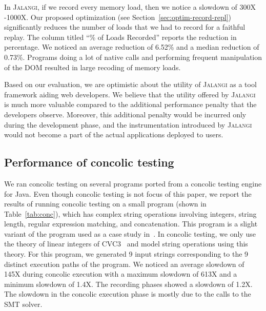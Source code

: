 \documentclass{sig-alternate}
\def\jalangi{\textsc{Jalangi}}
\begin{document}
In \jalangi{}, if we record every memory load, then we notice a
slowdown of 300X -1000X.  Our proposed optimization (see
Section~\ref{sec:optim-record-repl}) significantly reduces the number
of loads that we had to record for a faithful replay.  The column
titled ``\% of Loads Recorded'' reports the reduction in percentage.
We noticed an average reduction of 6.52\% and a median reduction of
0.73\%.  Programs doing a lot of native calls and performing frequent
manipulation of the DOM resulted in large recoding of memory loads.


Based on our evaluation, we are optimistic about the utility of
\jalangi{} as a tool framework aiding web developers.  We believe that
the utility offered by \jalangi{} is much more valuable compared to
the additional performance penalty that the developers
observe. Moreover, this additional penalty would be incurred only
during the development phase, and the instrumentation introduced by
\jalangi{} would not become a part of the actual applications deployed
to users.

\subsection{Performance of concolic testing}
\label{sec:conc-test-small}

We ran concolic testing on several programs ported from a concolic
testing engine for Java.  Even though concolic testing is not focus of
this paper, we report the results of running concolic testing on a
small program (shown in Table~\ref{tab:conc}), which has complex
string operations involving integers, string length, regular
expression matching, and concatenation.  This program is a slight
variant of the program used as a case study
in~\cite{Bjorner:2009:PFA:1532891.1532927}.  In concolic testing, we
only use the theory of linear integers of CVC3~\cite{BT07} and model
string operations using this theory.  For this program, we generated 9
input strings corresponding to the 9 distinct execution paths of the
program.  We noticed an average slowdown of 145X during concolic
execution with a maximum slowdown of 613X and a minimum slowdown of
1.4X.  The recording phases showed a slowdown of 1.2X.  The slowdown
in the concolic execution phase is mostly due to the calls to the SMT
solver.
\end{document}

